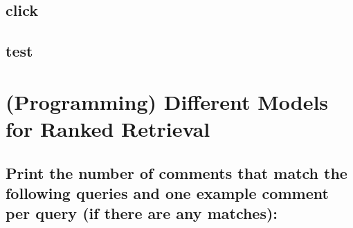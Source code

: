 \documentclass{scrartcl}
\begin{document}
\subsection{click }

\subsection{test}


\section{(Programming)  Different Models for Ranked Retrieval
}

\subsection{Print the number of comments that match the following queries and one example comment
	per query (if there are any matches):}
\end{document}
